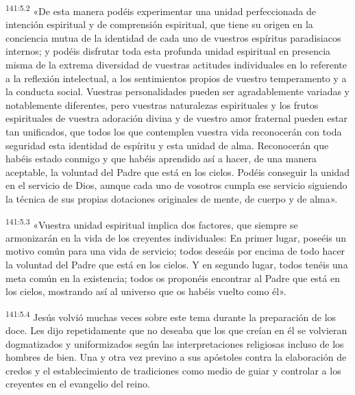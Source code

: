\par 
\textsuperscript{141:5.2} «De esta manera podéis experimentar una unidad perfeccionada de intención espiritual y de comprensión espiritual, que tiene su origen en la conciencia mutua de la identidad de cada uno de vuestros espíritus paradisiacos internos; y podéis disfrutar toda esta profunda unidad espiritual en presencia misma de la extrema diversidad de vuestras actitudes individuales en lo referente a la reflexión intelectual, a los sentimientos propios de vuestro temperamento y a la conducta social. Vuestras personalidades pueden ser agradablemente variadas y notablemente diferentes, pero vuestras naturalezas espirituales y los frutos espirituales de vuestra adoración divina y de vuestro amor fraternal pueden estar tan unificados, que todos los que contemplen vuestra vida reconocerán con toda seguridad esta identidad de espíritu y esta unidad de alma. Reconocerán que habéis estado conmigo y que habéis aprendido así a hacer, de una manera aceptable, la voluntad del Padre que está en los cielos. Podéis conseguir la unidad en el servicio de Dios, aunque cada uno de vosotros cumpla ese servicio siguiendo la técnica de sus propias dotaciones originales de mente, de cuerpo y de alma».

\par 
\textsuperscript{141:5.3} «Vuestra unidad espiritual implica dos factores, que siempre se armonizarán en la vida de los creyentes individuales: En primer lugar, poseéis un motivo común para una vida de servicio; todos deseáis por encima de todo hacer la voluntad del Padre que está en los cielos. Y en segundo lugar, todos tenéis una meta común en la existencia; todos os proponéis encontrar al Padre que está en los cielos, mostrando así al universo que os habéis vuelto como él».

\par 
\textsuperscript{141:5.4} Jesús volvió muchas veces sobre este tema durante la preparación de los doce. Les dijo repetidamente que no deseaba que los que creían en él se volvieran dogmatizados y uniformizados según las interpretaciones religiosas incluso de los hombres de bien. Una y otra vez previno a sus apóstoles contra la elaboración de credos y el establecimiento de tradiciones como medio de guiar y controlar a los creyentes en el evangelio del reino.

